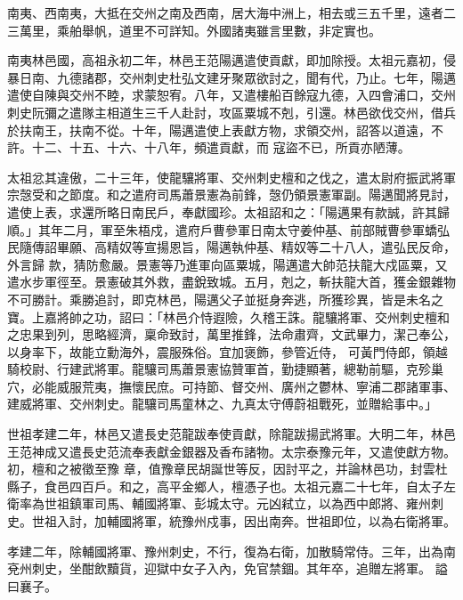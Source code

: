 
\begin{pinyinscope}

 南夷、西南夷，大抵在交州之南及西南，居大海中洲上，相去或三五千里，遠者二三萬里，乘舶舉帆，道里不可詳知。外國諸夷雖言里數，非定實也。



 南夷林邑國，高祖永初二年，林邑王范陽邁遣使貢獻，即加除授。太祖元嘉初，侵暴日南、九德諸郡，交州刺史杜弘文建牙聚眾欲討之，聞有代，乃止。七年，陽邁遣使自陳與交州不睦，求蒙恕宥。八年，又遣樓船百餘寇九德，入四會浦口，交州刺史阮彌之遣隊主相道生三千人赴討，攻區粟城不剋，引還。林邑欲伐交州，借兵於扶南王，扶南不從。十年，陽邁遣使上表獻方物，求領交州，詔答以道遠，不許。十二、十五、十六、十八年，頻遣貢獻，而
 寇盜不已，所貢亦陋薄。



 太祖忿其違傲，二十三年，使龍驤將軍、交州刺史檀和之伐之，遣太尉府振武將軍宗愨受和之節度。和之遣府司馬蕭景憲為前鋒，愨仍領景憲軍副。陽邁聞將見討，遣使上表，求還所略日南民戶，奉獻國珍。太祖詔和之：「陽邁果有款誠，許其歸順。」其年二月，軍至朱梧戍，遣府戶曹參軍日南太守姜仲基、前部賊曹參軍蟜弘民隨傳詔畢願、高精奴等宣揚恩旨，陽邁執仲基、精奴等二十八人，遣弘民反命，外言歸
 款，猜防愈嚴。景憲等乃進軍向區粟城，陽邁遣大帥范扶龍大戍區粟，又遣水步軍徑至。景憲破其外救，盡銳致城。五月，剋之，斬扶龍大首，獲金銀雜物不可勝計。乘勝追討，即克林邑，陽邁父子並挺身奔逃，所獲珍異，皆是未名之寶。上嘉將帥之功，詔曰：「林邑介恃遐險，久稽王誅。龍驤將軍、交州刺史檀和之忠果到列，思略經濟，稟命致討，萬里推鋒，法命肅齊，文武畢力，潔己奉公，以身率下，故能立勳海外，震服殊俗。宜加褒飾，參管近侍，
 可黃門侍郎，領越騎校尉、行建武將軍。龍驤司馬蕭景憲協贊軍首，勤捷顯著，總勒前驅，克殄巢穴，必能威服荒夷，撫懷民庶。可持節、督交州、廣州之鬱林、寧浦二郡諸軍事、建威將軍、交州刺史。龍驤司馬童林之、九真太守傅蔚祖戰死，並贈給事中。」



 世祖孝建二年，林邑又遣長史范龍跋奉使貢獻，除龍跋揚武將軍。大明二年，林邑王范神成又遣長史范流奉表獻金銀器及香布諸物。太宗泰豫元年，又遣使獻方物。初，檀和之被徵至豫
 章，值豫章民胡誕世等反，因討平之，并論林邑功，封雲杜縣子，食邑四百戶。和之，高平金鄉人，檀憑子也。太祖元嘉二十七年，自太子左衛率為世祖鎮軍司馬、輔國將軍、彭城太守。元凶弒立，以為西中郎將、雍州刺史。世祖入討，加輔國將軍，統豫州戍事，因出南奔。世祖即位，以為右衛將軍。



 孝建二年，除輔國將軍、豫州刺史，不行，復為右衛，加散騎常侍。三年，出為南兗州刺史，坐酣飲黷貨，迎獄中女子入內，免官禁錮。其年卒，追贈左將軍。
 謚曰襄子。




\end{pinyinscope}
